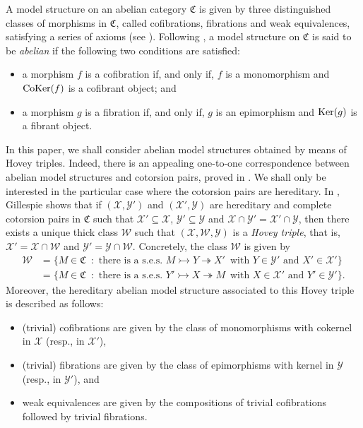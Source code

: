 \documentclass[10pt,reqno]{amsart}
\numberwithin{equation}{section}
\theoremstyle{remark}
\newcommand{\C}{\mathfrak{C}}
\newcommand{\X}{\mathcal{X}}
\newcommand{\Y}{\mathcal{Y}}
\begin{document}
A model structure on an abelian category $\C$ is given by three distinguished classes of morphisms in $\C$, called cofibrations, fibrations and weak equivalences, satisfying a series of axioms (see \cite{HoveyBook}). Following \cite{Hov02}, a model structure on $\C$ is said to be \emph{abelian} if the following two conditions are satisfied:
\begin{itemize}
\item a morphism $f$ is a cofibration if, and only if, $f$ is a monomorphism and ${\rm CoKer}(f)$ is a cofibrant object; and

\item a morphism $g$ is a fibration if, and only if, $g$ is an epimorphism and ${\rm Ker}(g)$ is a fibrant object.
\end{itemize}
In this paper, we shall consider abelian model structures obtained by means of Hovey triples. Indeed, there is an appealing one-to-one correspondence between abelian model structures and cotorsion pairs, proved in \cite[Thm. 2.2]{Hov02}. We shall only be interested in the particular case where the cotorsion pairs are hereditary. In \cite[Main Thm. 1.2]{GillespieHereditary}, Gillespie shows that if $(\mathcal{X},\mathcal{Y}')$ and $(\mathcal{X}',\mathcal{Y})$ are hereditary and complete cotorsion pairs in $\C$ such that $\mathcal{X}' \subseteq \mathcal{X}$, $\mathcal{Y}' \subseteq \mathcal{Y}$ and $\mathcal{X} \cap \mathcal{Y}' = \mathcal{X}' \cap \mathcal{Y}$, then there exists a unique thick class $\mathcal{W}$ such that $(\mathcal{X},\mathcal{W},\mathcal{Y})$ is a \emph{Hovey triple}, that is, $\mathcal{X}' = \mathcal{X} \cap \mathcal{W}$ and $\mathcal{Y}' = \mathcal{Y} \cap \mathcal{W}$. Concretely, the class $\mathcal{W}$ is given by 
\begin{align*}
\mathcal{W} & = \{ M \in \C \, \text{ : } \, \text{there is a s.e.s. } M \rightarrowtail Y \twoheadrightarrow X' \, \text{ with $Y \in \Y'$ and $X' \in \X'$} \} \\
& = \{ M \in \C \, \text{ : } \, \text{there is a s.e.s. } Y' \rightarrowtail X \twoheadrightarrow M \, \text{ with $X \in \X'$ and $Y' \in \Y'$} \}. 
\end{align*}
Moreover, the hereditary abelian model structure associated to this Hovey triple is described as follows:
\begin{itemize}
\item (trivial) cofibrations are given by the class of monomorphisms with cokernel in $\mathcal{X}$ (resp., in $\mathcal{X}'$),

\item (trivial) fibrations are given by the class of epimorphisms with kernel in $\mathcal{Y}$ (resp., in $\mathcal{Y}'$), and

\item weak equivalences are given by the compositions of trivial cofibrations followed by trivial fibrations. 
\end{itemize}
\end{document}
